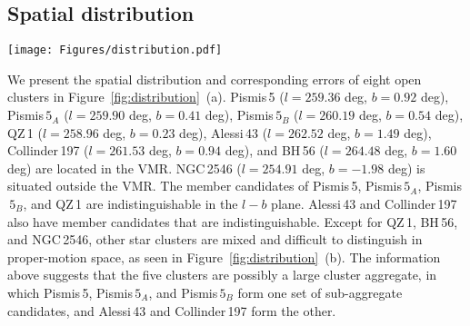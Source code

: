 \documentclass{aa} %
\begin{document}
\subsection{Spatial distribution} \label{sec:distribution}
\begin{figure*}%
    \centering
    \texttt{[image: Figures/distribution.pdf]}
    \caption{The spatial and proper motion distribution of eight open clusters. ~(a): The spatial distribution of open clusters in the Galactic coordinate system.
    ~(b): The distribution of proper motions of eight open clusters.
    ~(c): The spatial distribution of open clusters in the Galactocentric Cartesian coordinate 
    system on the X-Y plane. The stars with distance correction are shown by color dots, whereas 
    the position of the members without distance correction is shown by grey dots in the background. 
    The direction of the line of sight is shown by the grey arrow. The error bars are depicted in 
    the three diagrams by the grey lines. The data errors in position and proper motion space are 
    much smaller than the scale of the cluster itself. The contribution of errors to cluster search 
    and identification is negligible. \label{fig:distribution}} 
    
    \end{figure*} 

We present the spatial distribution and corresponding errors of eight open clusters in 
Figure~\ref{fig:distribution}~(a). Pismis\,5 ($l=259.36$ deg, $b=0.92$ deg), 
Pismis$\,5_{A}$ ($l=259.90$ deg, $b=0.41$ deg), Pismis$\,5_{B}$ ($l=260.19$ deg, $b=0.54$ deg),
QZ\,1 ($l=258.96$ deg, $b=0.23$ deg), Alessi\,43 ($l=262.52$ deg, $b=1.49$ deg), 
Collinder\,197 ($l=261.53$ deg, $b=0.94$ deg), and BH\,56 ($l=264.48$ deg, $b=1.60$ deg) are located
in the VMR. NGC\,2546 ($l=254.91$ deg, $b=-1.98$ deg) is situated outside the VMR.
The member candidates of Pismis\,5, Pismis$\,5_{A}$, Pismis$\,5_{B}$, and 
QZ\,1 are indistinguishable in the $l-b$ plane. Alessi\,43 and Collinder\,197 also have member candidates that are indistinguishable. Except for QZ\,1, BH\,56, and NGC\,2546, other star clusters 
are mixed and difficult to distinguish in proper-motion space, as seen in 
Figure~\ref{fig:distribution}~(b). The information above suggests that the five clusters are 
possibly a large cluster aggregate, in which Pismis\,5, Pismis$\,5_{A}$, and Pismis$\,5_{B}$ 
form one set of sub-aggregate candidates, and Alessi\,43 and Collinder\,197 form the other.
\end{document}
